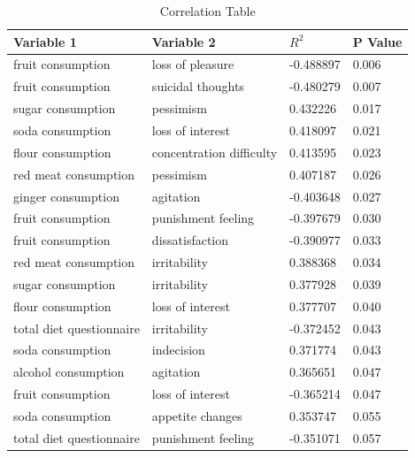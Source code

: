\documentclass[jou]{apa7}
\begin{document}
\begin{table}[H]
   \centering
   \begin{tabular}{@{}llll@{}}
       \toprule
       \textbf{Variable 1}         & \textbf{Variable 2}         & \textbf{$R^2$}     & \textbf{P Value} \\ \midrule
       fruit consumption           & loss of pleasure            & -0.488897          & 0.006            \\
       fruit consumption           & suicidal thoughts           & -0.480279          & 0.007            \\
       sugar consumption           & pessimism                   & 0.432226           & 0.017            \\
       soda consumption            & loss of interest            & 0.418097           & 0.021            \\
       flour consumption           & concentration difficulty    & 0.413595           & 0.023            \\
       red meat consumption        & pessimism                   & 0.407187           & 0.026            \\
       ginger consumption          & agitation                   & -0.403648          & 0.027            \\
       fruit consumption           & punishment feeling          & -0.397679          & 0.030            \\
       fruit consumption           & dissatisfaction             & -0.390977          & 0.033            \\
       red meat consumption        & irritability                & 0.388368           & 0.034            \\
       sugar consumption           & irritability                & 0.377928           & 0.039            \\
       flour consumption           & loss of interest            & 0.377707           & 0.040            \\
       total diet questionnaire    & irritability                & -0.372452          & 0.043            \\
       soda consumption            & indecision                  & 0.371774           & 0.043            \\
       alcohol consumption         & agitation                   & 0.365651           & 0.047            \\
       fruit consumption           & loss of interest            & -0.365214          & 0.047            \\
       soda consumption            & appetite changes            & 0.353747           & 0.055            \\
       total diet questionnaire    & punishment feeling          & -0.351071          & 0.057            \\ \bottomrule
   \end{tabular}
   \caption{Correlation Table}
   \label{tab:tableOfCorr}
\end{table}
\end{document}

